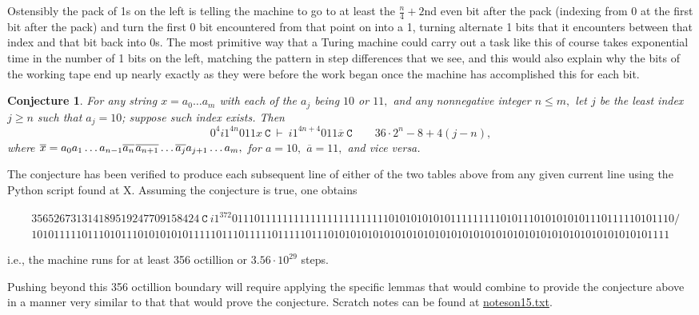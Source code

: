 \documentclass[12pt]{article}
\newtheorem*{conjecture}{Conjecture}
\begin{document}
Ostensibly the pack of 1s on the left is telling the machine to go to at least the $\frac n4+2$nd even bit after the pack
(indexing from 0 at the first bit after the pack) and turn the first 0 bit encountered from that point on into a 1,
turning alternate 1 bits that it encounters between that index and that bit back into 0s. The most primitive way that
a Turing machine could carry out a task like this of course takes exponential time in the number of 1 bits on the left,
matching the pattern in step differences that we see, and this would also explain why the bits of the working tape end up
nearly exactly as they were before the work began once the machine has accomplished this for each bit. 

\newpage

\begin{conjecture}
For any string $x=a_0\ldots a_m$
with each of the $a_j$ being $10$ or $11,$
and any nonnegative integer $n\leq m,$
let $j$ be the least index $j\geq n$ such that $a_j=10$;
suppose such index exists.
Then
$$0^4 i1^{4n}011x~\texttt{C}~\vdash~
i1^{4n+4}011\overline x~\texttt{C}\quad\quad36\cdot2^n-8+4(j-n),$$
where $\overline x = 
a_0a_1\ldots a_{n-1}\overline{a_{n}}\hspace{.08883em}\overline{a_{n+1}}\ldots\overline{a_j}
a_{j+1}\ldots a_m,$ for $a=10,$ $\overline a=11,$ and vice versa.
\end{conjecture}

The conjecture has been verified to produce each subsequent line of either of the two tables above
from any given current line using the Python script found at X. Assuming the conjecture is true,
one obtains
\begin{tiny}
\begin{align*}
&356526731314189519247709158424~\texttt{C}~i1^{372}0111011111111111111111111111010101010101111111110101110101010101110111110101110/\\
&101011111011101011101010101011111011101111101111101110101010101010101010101010101010101010101010101010101010101111
\end{align*}
\end{tiny}
i.e., the machine runs for at least 356 octillion or $3.56\cdot10^{29}$ steps.

Pushing beyond this 356 octillion boundary will require applying the specific lemmas that would
combine to provide the conjecture above in a manner very similar to that that would prove the conjecture.
Scratch notes can be found at
\href{https://github.com/danbriggs/Turing/blob/master/paper/noteson15.txt}{noteson15.txt}.
\end{document}
